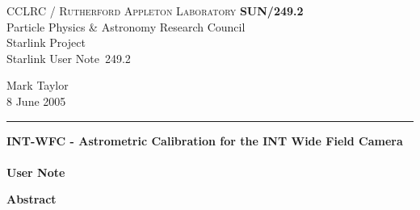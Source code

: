 \documentclass[twoside,11pt]{article}
\newcommand{\stardoccategory}  {Starlink User Note}
\newcommand{\stardocinitials}  {SUN}
\newcommand{\stardocnumber}    {249.2}
\newcommand{\stardocauthors}   {Mark Taylor}
\newcommand{\stardocdate}      {8 June 2005}
\newcommand{\stardoctitle}     {INT-WFC - Astrometric Calibration for the INT Wide Field Camera}
\newcommand{\stardocversion}   {}
\newcommand{\stardocmanual}    {User Note}
\newcommand{\stardocname}{\stardocinitials /\stardocnumber}
\newenvironment{latexonly}{}{}
\renewcommand{\_}{\texttt{\symbol{95}}}
\begin{document}
\thispagestyle{empty}

\begin{latexonly}
   CCLRC / \textsc{Rutherford Appleton Laboratory} \hfill \textbf{\stardocname}\\
   {\large Particle Physics \& Astronomy Research Council}\\
   {\large Starlink Project\\}
   {\large \stardoccategory\ \stardocnumber}
   \begin{flushright}
   \stardocauthors\\
   \stardocdate
   \end{flushright}
   \vspace{-4mm}
   \rule{\textwidth}{0.5mm}
   \vspace{5mm}
   \begin{center}
   {\Huge\textbf{\stardoctitle \\ [2.5ex]}}
   {\LARGE\textbf{\stardocversion \\ [4ex]}}
   {\Huge\textbf{\stardocmanual}}
   \end{center}
   \vspace{5mm}


   \vspace{10mm}
   \begin{center}
      {\Large\textbf{Abstract}}
   \end{center}
\end{latexonly}
\end{document}
